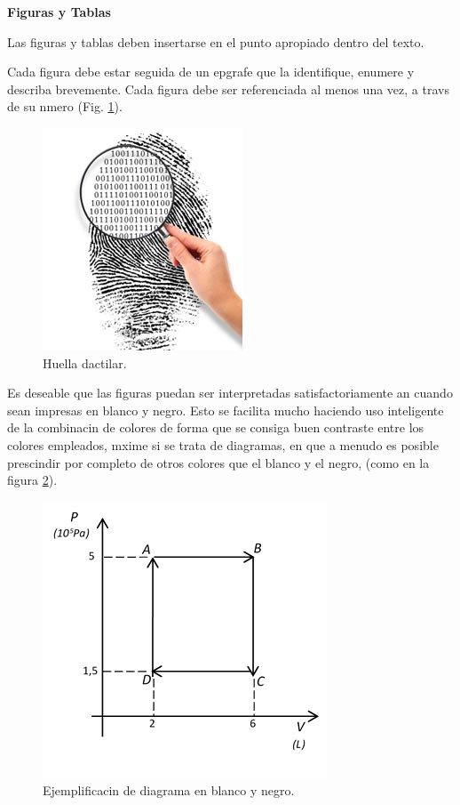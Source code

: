 \textbf{Figuras y Tablas}

Las figuras y tablas deben insertarse en el punto apropiado dentro del texto.

Cada figura debe estar seguida de un epgrafe que la identifique, enumere y describa brevemente. Cada figura debe ser referenciada al menos una vez, a travs de su nmero (Fig. \ref{fig:huella}).

\begin{figure}[H]
\begin{center}
\includegraphics[scale = .5]{./capitulo_04/huella}
\caption{Huella dactilar.}
\label{fig:huella}
\end{center}
\end{figure}

Es deseable que las figuras puedan ser interpretadas satisfactoriamente an cuando sean impresas en blanco y negro. Esto se facilita mucho haciendo uso inteligente de la combinacin de colores de forma que se consiga buen contraste entre los colores empleados, mxime si se trata de diagramas, en que a menudo es posible prescindir por completo de otros colores que el blanco y el negro, (como en la figura \ref{fig:termodin}).

\begin{figure}[H]
\begin{center}
\includegraphics{./capitulo_04/termodin.png}
\caption{Ejemplificacin de diagrama en blanco y negro.}
\label{fig:termodin}
\end{center}
\end{figure}

